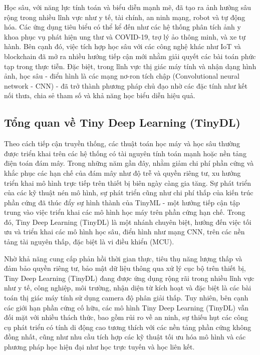 Học sâu, với năng lực tính toán và biểu diễn mạnh mẽ, đã tạo ra ảnh hưởng sâu rộng trong nhiều lĩnh vực như y tế, tài chính, an ninh mạng, robot và tự động hóa. Các ứng dụng tiêu biểu có thể kể đến như các hệ thống phân tích ảnh y khoa phục vụ phát hiện ung thư và COVID-19, trợ lý ảo thông minh, và xe tự hành. Bên cạnh đó, việc tích hợp học sâu với các công nghệ khác như IoT và blockchain đã mở ra nhiều hướng tiếp cận mới nhằm giải quyết các bài toán phức tạp trong thực tiễn\cite{27_alzubaidi_2021_review}. Đặc biệt, trong lĩnh vực thị giác máy tính và nhận dạng hình ảnh, học sâu - điển hình là các mạng nơ-ron tích chập (Convolutional neural network - CNN) - đã trở thành phương pháp chủ đạo nhờ các đặc tính như kết nối thưa, chia sẻ tham số và khả năng học biểu diễn hiệu quả\cite{Goodfellow-et-al-2016}.
\subsection{Tổng quan về Tiny Deep Learning (TinyDL)}
Theo cách tiếp cận truyền thống, các thuật toán học máy và học sâu thường được triển khai trên các hệ thống có tài nguyên tính toán mạnh hoặc nền tảng điện toán đám mây. Trong những năm gần đây, nhằm giảm chi phí phần cứng và khắc phục các hạn chế của đám mây như độ trễ và quyền riêng tư, xu hướng triển khai mô hình trực tiếp trên thiết bị biên ngày càng gia tăng\cite{29_10177729}. Sự phát triển của các kỹ thuật nén mô hình, sự phát triển cũng như chi phí thấp của kiến trúc phần cứng đã thúc đẩy sự hình thành của TinyML - một hướng tiếp cận tập trung vào việc triển khai các mô hình học máy trên phần cứng hạn chế\cite{1_warden_2020_tinyml}. Trong đó, Tiny Deep Learning (TinyDL) là một nhánh chuyên biệt, hướng đến việc tối ưu và triển khai các mô hình học sâu, điển hình như mạng CNN, trên các nền tảng tài nguyên thấp, đặc biệt là vi điều khiển (MCU)\cite{14_10.1145/3776588}.

Nhờ khả năng cung cấp phản hồi thời gian thực, tiêu thụ năng lượng thấp và đảm bảo quyền riêng tư, bảo mật dữ liệu thông qua xử lý cục bộ trên thiết bị, Tiny Deep Learning (TinyDL) đang được ứng dụng rộng rãi trong nhiều lĩnh vực như y tế, công nghiệp, môi trường, nhận diện từ kích hoạt và đặc biệt là các bài toán thị giác máy tính sử dụng camera độ phân giải thấp. Tuy nhiên, bên cạnh các giới hạn phần cứng cố hữu, các mô hình Tiny Deep Learning (TinyDL) vẫn đối mặt với nhiều thách thức, bao gồm rủi ro về an ninh, sự thiếu hụt các công cụ phát triển có tính di động cao tương thích với các nền tảng phần cứng không đồng nhất, cũng như nhu cầu tích hợp các kỹ thuật tối ưu hóa mô hình và các phương pháp học hiện đại như học trực tuyến và học liên kết. \cite{14_10.1145/3776588}


